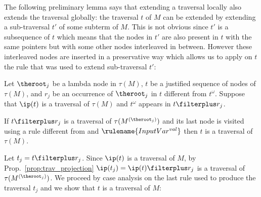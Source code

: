 The following preliminary lemma says that extending a traversal locally also extends the
traversal globally: the traversal $t$ of $M$ can be extended by
extending a sub-traversal $t'$ of some subterm of $M$. This is
not obvious since $t'$ is a subsequence of $t$ which means that the
nodes in $t'$ are also present in $t$ with the same pointers but
with some other nodes interleaved in between. However these
interleaved nodes are inserted in a preservative way which allows us
to apply on $t$ the rule that was used to extend sub-traversal $t'$:
\begin{lemma}
\label{lem:subtraversal_progression} Let $\theroot_j$ be a lambda node in $\tau(M)$,
$t$ be a justified sequence of nodes of $\tau(M)$, and $r_j$ be an occurrence of $\theroot_j$ in $t$ different from $t^\omega$.
Suppose that $\ip(t)$ is a traversal of $\tau(M)$ and $t^\omega$ appears in $t\filterplus r_j$.

If $t \filterplus r_j$ is a traversal of $\tau(M^{(\theroot_j)})$
and its last node is visited using a rule different from  and $\rulename{InputVar^{val}}$
then $t$ is a traversal of $\tau(M)$.
\end{lemma}
\proof Let $t_j = t \filterplus r_j$. Since $\ip(t)$ is a traversal of
$M$, by Prop.\ \ref{prop:trav_projection} $\ip(t_j) = \ip(t)
\filterplus r_j$ is a traversal of $\tau(M^{(\theroot_j)})$.
  We proceed by case analysis on the last rule used to produce the traversal $t_j$ and we show that $t$ is a traversal of $M$:
